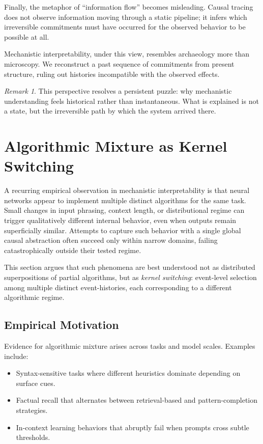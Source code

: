 \documentclass[11pt]{article}
\theoremstyle{remark}
\newtheorem{remark}{Remark}
\begin{document}
Finally, the metaphor of ``information flow'' becomes misleading.
Causal tracing does not observe information moving through a static
pipeline; it infers which irreversible commitments must have occurred
for the observed behavior to be possible at all.

Mechanistic interpretability, under this view, resembles archaeology
more than microscopy. We reconstruct a past sequence of commitments
from present structure, ruling out histories incompatible with the
observed effects.

\begin{remark}
This perspective resolves a persistent puzzle: why mechanistic
understanding feels historical rather than instantaneous. What is
explained is not a state, but the irreversible path by which the system
arrived there.
\end{remark}

\section{Algorithmic Mixture as Kernel Switching}

A recurring empirical observation in mechanistic interpretability is
that neural networks appear to implement multiple distinct algorithms
for the same task. Small changes in input phrasing, context length, or
distributional regime can trigger qualitatively different internal
behavior, even when outputs remain superficially similar. Attempts to
capture such behavior with a single global causal abstraction often
succeed only within narrow domains, failing catastrophically outside
their tested regime.

This section argues that such phenomena are best understood not as
distributed superpositions of partial algorithms, but as \emph{kernel
switching}: event-level selection among multiple distinct
event-histories, each corresponding to a different algorithmic regime.

\subsection{Empirical Motivation}

Evidence for algorithmic mixture arises across tasks and model scales.
Examples include:
\begin{itemize}
\item Syntax-sensitive tasks where different heuristics dominate
depending on surface cues.
\item Factual recall that alternates between retrieval-based and
pattern-completion strategies.
\item In-context learning behaviors that abruptly fail when prompts
cross subtle thresholds.
\end{itemize}
\end{document}
